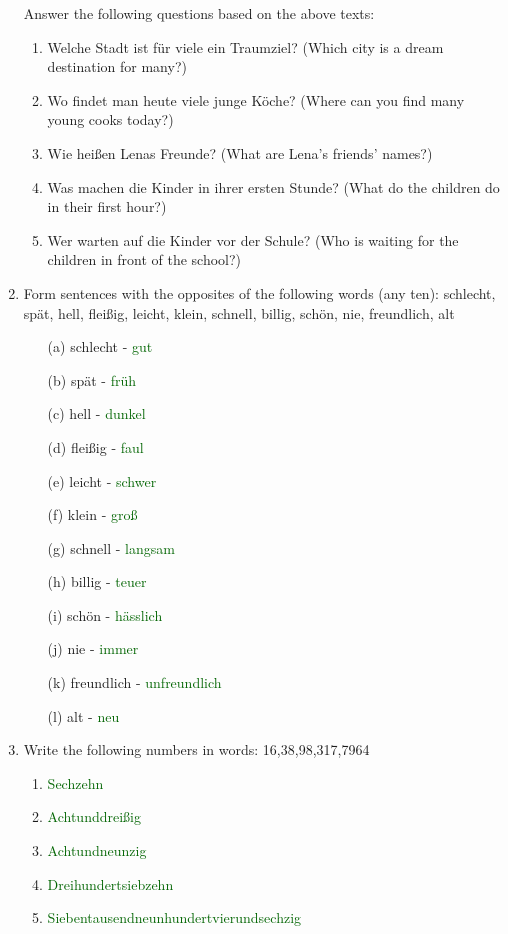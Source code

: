 \documentclass{article}
\begin{document}
\begin{enumerate}
    Answer the following questions based on the above texts:
    \begin{enumerate}
        \item Welche Stadt ist für viele ein Traumziel? (Which city is a dream destination for many?)
        \item Wo findet man heute viele junge Köche? (Where can you find many young cooks today?)
        \item Wie heißen Lenas Freunde? (What are Lena's friends' names?)
        \item Was machen die Kinder in ihrer ersten Stunde? (What do the children do in their first hour?)
        \item Wer warten auf die Kinder vor der Schule? (Who is waiting for the children in front of the school?)
    \end{enumerate}
    \item Form sentences with the opposites of the following words (any ten):
    schlecht, spät, hell, fleißig, leicht, klein, schnell, billig, schön, nie, freundlich, alt
    \begin{enumerate}
        \item[(a)] schlecht - \textcolor{darkgreen}{gut}
        \item[(b)] spät - \textcolor{darkgreen}{früh}
        \item[(c)] hell - \textcolor{darkgreen}{dunkel}
        \item[(d)] fleißig - \textcolor{darkgreen}{faul}
        \item[(e)] leicht - \textcolor{darkgreen}{schwer}
        \item[(f)] klein - \textcolor{darkgreen}{groß}
        \item[(g)] schnell - \textcolor{darkgreen}{langsam}
        \item[(h)] billig - \textcolor{darkgreen}{teuer}
        \item[(i)] schön - \textcolor{darkgreen}{hässlich}
        \item[(j)] nie - \textcolor{darkgreen}{immer}
        \item[(k)] freundlich - \textcolor{darkgreen}{unfreundlich}
        \item[(l)] alt - \textcolor{darkgreen}{neu}
    \end{enumerate}
    \item Write the following numbers in words:
    16,38,98,317,7964
    \begin{enumerate}
        \item \textcolor{darkgreen}{Sechzehn}
        \item \textcolor{darkgreen}{Achtunddreißig}
        \item \textcolor{darkgreen}{Achtundneunzig}
        \item \textcolor{darkgreen}{Dreihundertsiebzehn}
        \item \textcolor{darkgreen}{Siebentausendneunhundertvierundsechzig}
    \end{enumerate}


\end{enumerate}
\end{document}
